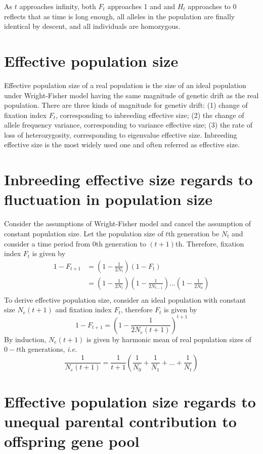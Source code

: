 \documentclass[11pt]{article}
\begin{document}
\begin{sloppypar}
\par

As $t$ approaches infinity, both $F_t$ approaches 1 and and $H_t$ approaches to 0 reflects that as time is long enough, all alleles in the population are finally identical by descent, and all individuals are homozygous. 

\section{Effective population size}
Effective population size of a real population is the size of an ideal population under Wright-Fisher model having the same magnitude of genetic drift as the real population. 
There are three kinds of magnitude for genetiv drift: 
(1) change of fixation index $F_t$, corresponding to inbreeding effective size; 
(2) the change of allele frequency variance, corresponding to variance effective size; 
(3) the rate of loss of heterozygosity, corresponding to eigenvalue effective size. 
Inbreeding effective size is the most widely used one and often referred as effective size. 

\section{Inbreeding effective size regards to fluctuation in population size}
Consider the assumptions of Wright-Fisher model and cancel the assumption of constant population size. 
Let the population size of $t$th generation be $N_t$ and consider a time period from 0th generation to $(t+1)$th. 
Therefore, fixation index $F_t$ is given by 
\begin{equation}
\begin{align}
  1-F_{t+1} &= (1-\frac{1}{2N_t})(1-F_t) \\
            &= (1-\frac{1}{2N_t})(1-\frac{1}{2N_{t-1}}) \dots (1-\frac{1}{2N_0}) \\
\end{align}
\end{equation}
To derive effective population size, consider an ideal population with constant size $N_e(t+1)$ and fixation index $F_t$, therefore $F_t$ is given by
\begin{equation}
  1-F_{t+1} = (1-\frac{1}{2N_e(t+1)})^{t+1}
\end{equation}
By induction, $N_e(t+1)$ is given by harmonic mean of real population sizes of $0-t$th generations, \textit{i.e.}
\begin{equation}
  \frac{1}{N_e(t+1)} = \frac{1}{t+1} (\frac{1}{N_0}+\frac{1}{N_1}+\dots+\frac{1}{N_t})
\end{equation}

\section{Effective population size regards to unequal parental contribution to offspring gene pool}


\end{sloppypar}
\end{document}
